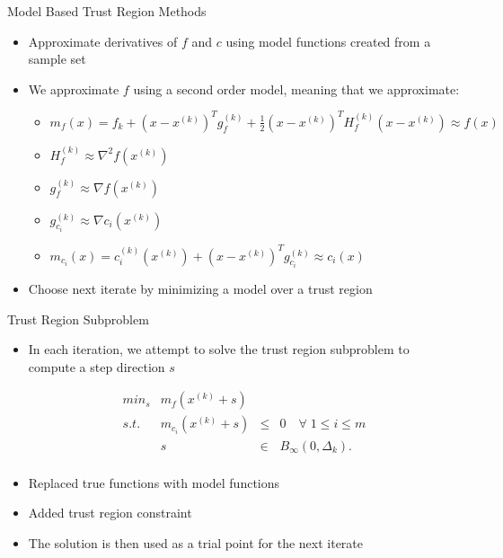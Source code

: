 \documentclass{beamer}
\newcommand{\xk}{{{x}^{(k)}}}
\newcommand{\dk}{{\Delta_k}}
\newcommand{\mk}{{m_f}}
\newcommand{\fk}{{f_k}}
\newcommand{\fgk}{{g^{(k)}_f}}
\newcommand{\fhk}{{H^{(k)}_f}}
\newcommand{\ck}{{c^{(k)}_{i}(\xk)}}
\newcommand{\cgk}{{g^{(k)}_{c_i}}}
\newcommand{\mck}{{m_{c_i}}}
\begin{document}
\begin{frame}{Model Based Trust Region Methods}
	\begin{itemize}
		\item Approximate derivatives of $f$ and $c$ using model functions created from a sample set
		\item We approximate $f$ using a second order model, meaning that we approximate:
		\begin{itemize}
			\item $\mk(x) = \fk + \left(x - \xk \right)^T\fgk + \frac 1 2 \left(x - \xk \right)^T\fhk\left(x - \xk \right) \approx f(x)$
			\item $\fhk \approx \nabla ^2 f(\xk)$
			\item $\fgk \approx \nabla f(\xk)$
			\item $\cgk \approx \nabla c_i(\xk)$
			\item $\mck(x) = \ck + \left(x - \xk\right)^T\cgk \approx c_i(x)$
		\end{itemize}
		\item Choose next iterate by minimizing a model over a trust region
	\end{itemize}
\end{frame}

\begin{frame}{Trust Region Subproblem}
	\begin{itemize}
		\item In each iteration, we attempt to solve the trust region subproblem to compute a step direction $s$

		\begin{displaymath}
\begin{array}{lrcc}
min_s & \mk(\xk + s)   &	 &			\\
s.t.  &  \mck(\xk + s) & \le & 0   \quad \forall \; 1 \le i \le m	   \\
	  &  s & \in & B_{\infty}(0, \dk).  \\
\end{array}
		\end{displaymath}
		\item Replaced true functions with model functions
		\item Added trust region constraint
		\item The solution is then used as a trial point for the next iterate
	\end{itemize}
\end{frame}

\end{document}
